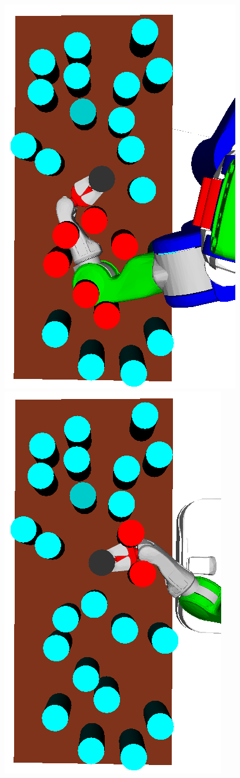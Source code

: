 \begin{figure}[t]
  \vspace{0.5em}
  \centering
    \noindent
    \includegraphics[scale=0.17, angle=270]{images/grasp_teaser_bad.png}
    \includegraphics[scale=0.17, angle=270]{images/grasp_teaser_good.png}

\end{figure}

